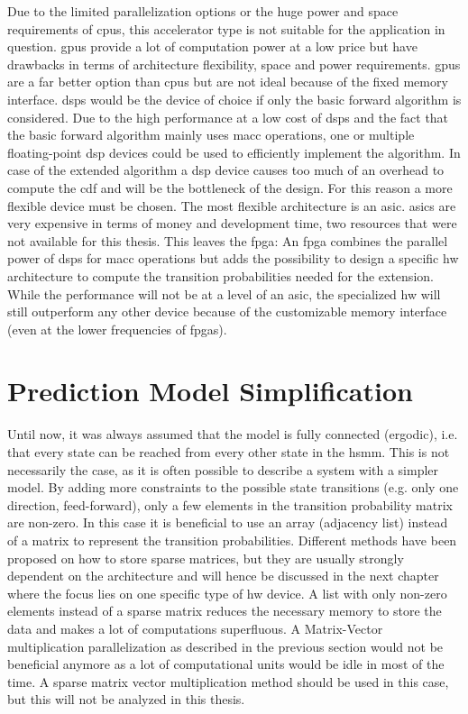 \documentclass[mscthesis]{usiinfthesis}
\begin{document}
Due to the limited parallelization options or the huge power and space
requirements of \glspl{cpu}, this accelerator type is not suitable for the
application in question. \glspl{gpu} provide a lot of computation power at
a low price but have drawbacks in terms of architecture flexibility, space and
power requirements. \glspl{gpu} are a far better option than \glspl{cpu} but
are not ideal because of the fixed memory interface. \glspl{dsp} would be the
device of choice if only the basic forward algorithm is considered. Due to the
high performance at a low cost of \glspl{dsp} and the fact that the basic
forward algorithm mainly uses \gls{macc} operations, one or multiple
floating-point \gls{dsp} devices could be used to efficiently implement the
algorithm.  In case of the extended algorithm a \gls{dsp} device causes too
much of an overhead to compute the \gls{cdf} and will be the bottleneck of the
design. For this reason a more flexible device must be chosen. The most
flexible architecture is an \gls{asic}. \glspl{asic} are very expensive in
terms of money and development time, two resources that were not available for
this thesis. This leaves the \gls{fpga}: An \gls{fpga} combines the parallel
power of \glspl{dsp} for \gls{macc} operations but adds the possibility to
design a specific \gls{hw} architecture to compute the transition probabilities
needed for the extension. While the performance will not be at a level of an
\gls{asic}, the specialized \gls{hw} will still outperform any other device
because of the customizable memory interface (even at the lower frequencies of
\glspl{fpga}).

\section{Prediction Model Simplification}
\label{ch:analysis_simple}

Until now, it was always assumed that the model is fully connected (ergodic),
i.e. that every state can be reached from every other state in the \gls{hsmm}.
This is not necessarily the case, as it is often possible to describe a system
with a simpler model. By adding more constraints to the possible state
transitions (e.g. only one direction, feed-forward), only a few elements in the
transition probability matrix are non-zero. In this case it is beneficial to
use an array (adjacency list) instead of a matrix to represent the transition
probabilities. Different methods have been proposed on how to store sparse
matrices, but they are usually strongly dependent on the architecture and will
hence be discussed in the next chapter where the focus lies on one specific
type of \gls{hw} device. A list with only non-zero elements instead of a sparse
matrix reduces the necessary memory to store the data and makes a lot of
computations superfluous. A Matrix-Vector multiplication parallelization as
described in the previous section would not be beneficial anymore as a lot of
computational units would be idle in most of the time. A sparse matrix vector
multiplication method should be used in this case, but this will not be
analyzed in this thesis.
\end{document}
